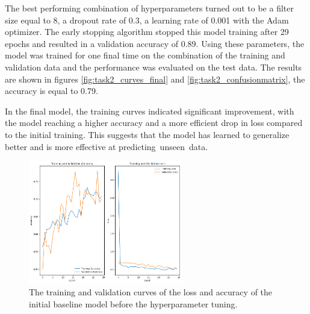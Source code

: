 \documentclass[conference]{IEEEtran}
\begin{document}
The best performing combination of hyperparameters turned out to be a filter size  equal to 8, a dropout rate of 0.3, a learning rate of 0.001 with the Adam optimizer. The early stopping algorithm stopped this model training after 29 epochs and resulted in a validation accuracy of 0.89. Using these parameters, the model was trained for one final time on the combination of the training and validation data and the performance was evaluated on the test data. The results are shown in figures \ref{fig:task2_curves_final} and \ref{fig:task2_confusionmatrix}, the accuracy is equal to 0.79.


In the final model, the training curves indicated significant improvement, with the model reaching a higher accuracy and a more efficient drop in loss compared to the initial training. This suggests that the model has learned to generalize better and is more effective at predicting unseen data.










\begin{figure}[p] \centering \includegraphics[width=0.6\textwidth]{fig_task2_training_curves_train_validation_initial_model.png} 
	\caption{The training and validation curves of the loss and accuracy of the initial baseline model before the hyperparameter tuning.} 
	\label{fig:task2_curves_initial} 
\end{figure}
\end{document}
